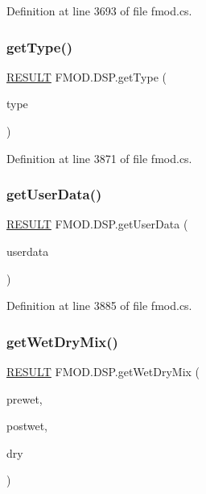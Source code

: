 Definition at line 3693 of file fmod.\+cs.

\mbox{\label{class_f_m_o_d_1_1_d_s_p_a90873e967a2e0bec74828ed1da507cde}} 
\subsubsection{\texorpdfstring{get\+Type()}{getType()}}
{\footnotesize\ttfamily \hyperlink{namespace_f_m_o_d_a305d1176ef3f8c8815861a60407ac33d}{R\+E\+S\+U\+LT} F\+M\+O\+D.\+D\+S\+P.\+get\+Type (\begin{DoxyParamCaption}\item[{out \hyperlink{namespace_f_m_o_d_abfbbfe13740257430ae8350c2456b0ff}{D\+S\+P\+\_\+\+T\+Y\+PE}}]{type }\end{DoxyParamCaption})}



Definition at line 3871 of file fmod.\+cs.

\mbox{\label{class_f_m_o_d_1_1_d_s_p_ade41e932d36f2075c359f9531215fad5}} 
\subsubsection{\texorpdfstring{get\+User\+Data()}{getUserData()}}
{\footnotesize\ttfamily \hyperlink{namespace_f_m_o_d_a305d1176ef3f8c8815861a60407ac33d}{R\+E\+S\+U\+LT} F\+M\+O\+D.\+D\+S\+P.\+get\+User\+Data (\begin{DoxyParamCaption}\item[{out Int\+Ptr}]{userdata }\end{DoxyParamCaption})}



Definition at line 3885 of file fmod.\+cs.

\mbox{\label{class_f_m_o_d_1_1_d_s_p_ae5fffc548d67b21ba56c0c678e7d3a78}} 
\subsubsection{\texorpdfstring{get\+Wet\+Dry\+Mix()}{getWetDryMix()}}
{\footnotesize\ttfamily \hyperlink{namespace_f_m_o_d_a305d1176ef3f8c8815861a60407ac33d}{R\+E\+S\+U\+LT} F\+M\+O\+D.\+D\+S\+P.\+get\+Wet\+Dry\+Mix (\begin{DoxyParamCaption}\item[{out float}]{prewet,  }\item[{out float}]{postwet,  }\item[{out float}]{dry }\end{DoxyParamCaption})}



